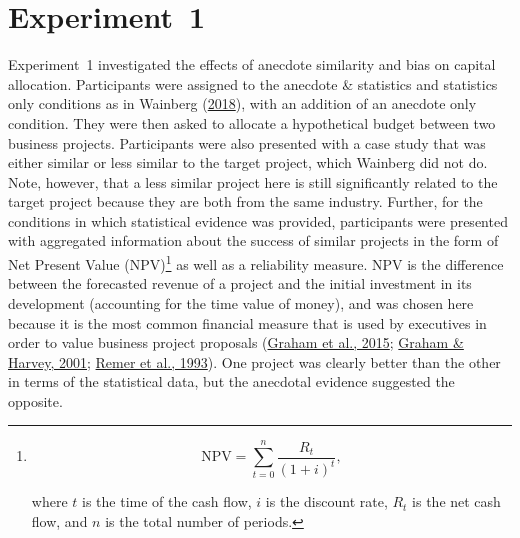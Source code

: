 \documentclass[
  man, donotrepeattitle,floatsintext]{apa7}
\theoremstyle{definition}
\theoremstyle{definition}
\theoremstyle{definition}
\theoremstyle{definition}
\theoremstyle{remark}
\begin{document}
\hypertarget{anecdotes-1}{%
\section{Experiment~1}\label{anecdotes-1}}

Experiment~1 investigated the effects of anecdote similarity and bias on capital
allocation. Participants were assigned to the anecdote \& statistics and
statistics only conditions as in Wainberg (\protect\hyperlink{ref-wainberg2018}{2018}), with an addition of an anecdote
only condition. They were then asked to allocate a hypothetical budget between
two business projects. Participants were also presented with a case study that
was either similar or less similar to the target project, which Wainberg did not
do. Note, however, that a less similar project here is still significantly
related to the target project because they are both from the same industry.
Further, for the conditions in which statistical evidence was provided,
participants were presented with aggregated information about the success of
similar projects in the form of Net Present Value (NPV)\footnote{\[
  \text{NPV}=\sum_{t=0}^n \frac{R_t}{(1+i)^t},
  \]

  where \(t\) is the time of the cash flow, \(i\) is the discount rate, \(R_t\) is the
  net cash flow, and \(n\) is the total number of periods.} as well as a
reliability measure. NPV is the difference between the forecasted revenue of a
project and the initial investment in its development (accounting for the time
value of money), and was chosen here because it is the most common financial
measure that is used by executives in order to value business project proposals
(\protect\hyperlink{ref-graham2015}{Graham et al., 2015}; \protect\hyperlink{ref-graham2001}{Graham \& Harvey, 2001}; \protect\hyperlink{ref-remer1993}{Remer et al., 1993}). One project was clearly better than the
other in terms of the statistical data, but the anecdotal evidence suggested the
opposite.
\end{document}
